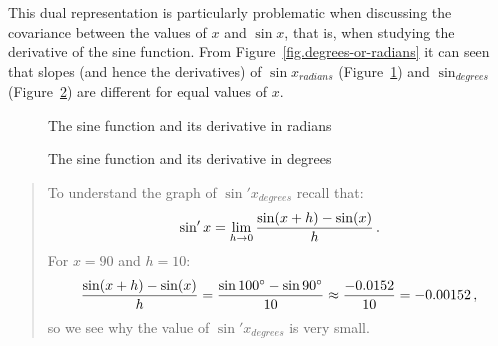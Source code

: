 This dual representation is particularly problematic when discussing the covariance between the values of $x$ and $\sin x$, that is, when studying the derivative of the sine function.
From Figure~\ref{fig.degrees-or-radians} it can seen that slopes (and hence the derivatives) of $\sin x_{\textit{radians}}$ (Figure~\ref{fig.derivative-in-radians}) and $\sin_{\textit{degrees}}$ (Figure~\ref{fig.derivative-in-degrees}) are different for equal values of $x$. 

\begin{figure}[htb]
\begin{center}
\caption{The sine function and its derivative in radians}\label{fig.derivative-in-radians}
\end{center}
\end{figure}

\begin{figure}[htb]
\begin{center}
\caption{The sine function and its derivative in degrees}\label{fig.derivative-in-degrees}
\end{center}
\end{figure}

\begin{quote}
To understand the graph of $\sin' x_{\textit{degrees}}$ recall that:
\[
\sin' x=\lim_{h\rightarrow 0} \displaystyle\frac{\sin(x+h)-\sin(x)}{h}\,.
\]
For $x=90$ and $h=10$:
\[
\displaystyle\frac{\sin(x+h)-\sin(x)}{h} = \displaystyle\frac{\sin 100^\circ-\sin 90^\circ}{10}\approx \displaystyle\frac{-0.0152}{10}=-0.00152\,,
\]
so we see why the value of $\sin' x_{\textit{degrees}}$ is very small.
\end{quote}

